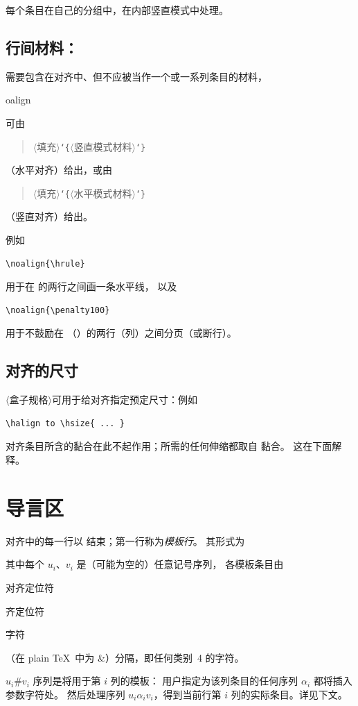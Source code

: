 \documentclass[a4paper]{rapport3}
\makeatletter
\def\lb{{\tt\char`\{}}\def\rb{{\tt\char`\}}}
\def\gr#1{$\langle$#1$\rangle$}\def\key#1{{\tt#1}}
\newenvironment{disp}{\begin{quotation}}{\end{quotation}}
\def\term#1\par{\index{#1}}
\def\cstoidx#1\par{\index{#1@\cs{#1}}}
\makeatother
\begin{document}
每个条目在自己的分组中，在内部竖直模式中处理。

\subsection{行间材料：}

需要包含在对齐中、但不应被当作一个或一系列条目的材料，
\cstoidx noalign\par
可由
\begin{disp}\gr{填充}\lb\gr{竖直模式材料}\rb
\end{disp}（水平对齐）给出，或由
\begin{disp}\gr{填充}\lb\gr{水平模式材料}\rb
\end{disp}（竖直对齐）给出。

例如
\begin{verbatim}
\noalign{\hrule}
\end{verbatim}
用于在  的两行之间画一条水平线，
以及
\begin{verbatim}
\noalign{\penalty100}
\end{verbatim}
用于不鼓励在 （）的两行（列）之间分页（或断行）。

\subsection{对齐的尺寸}

\gr{盒子规格}可用于给对齐指定预定尺寸：例如
\begin{verbatim}
\halign to \hsize{ ... }
\end{verbatim}
对齐条目所含的黏合在此不起作用；所需的任何伸缩都取自  黏合。
这在下面解释。

\section{导言区}

对齐中的每一行以  结束；第一行称为{\it 模板行}。
其形式为
\begin{disp}\end{disp}
其中每个 $u_i$、$v_i$ 是（可能为空的）任意记号序列，
各模板条目由{\italic 对齐定位符
\term 对齐定位符\par
字符}（在 plain \TeX\ 中为 \n\&）分隔，即任何类别~4 的字符。

$u_i$\n\#$v_i$ 序列是将用于第 $i$ 列的模板：
用户指定为该列条目的任何序列 $\alpha_i$ 都将插入参数字符处。
然后处理序列 $u_i\alpha_iv_i$，得到当前行第 $i$ 列的实际条目。详见下文。
\end{document}
